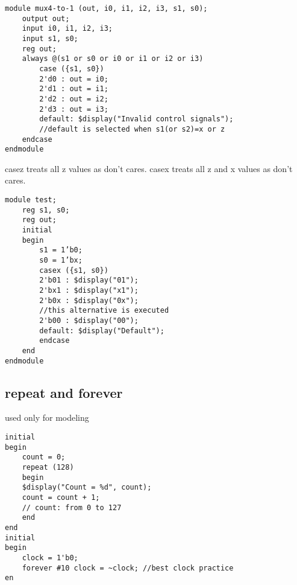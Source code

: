 \begin{lstlisting}
module mux4-to-1 (out, i0, i1, i2, i3, s1, s0);
    output out;
    input i0, i1, i2, i3;
    input s1, s0;
    reg out;
    always @(s1 or s0 or i0 or i1 or i2 or i3)
        case ({s1, s0}) 
        2'd0 : out = i0;
        2'd1 : out = i1;
        2'd2 : out = i2;
        2'd3 : out = i3;
        default: $display("Invalid control signals");
        //default is selected when s1(or s2)=x or z 
    endcase
endmodule
\end{lstlisting}

casez treats all z values as don't cares. casex treats all z and x values as don't cares.

\begin{lstlisting}
module test;
    reg s1, s0;
    reg out;
    initial
    begin
        s1 = 1’b0;
        s0 = 1’bx;
        casex ({s1, s0}) 
        2'b01 : $display("01"); 
        2'bx1 : $display("x1");
        2'b0x : $display("0x"); 
        //this alternative is executed
        2'b00 : $display("00");
        default: $display("Default");
        endcase
    end 
endmodule
\end{lstlisting}

\subsection{repeat and forever}
used only for modeling

\begin{lstlisting}
initial
begin
    count = 0;
    repeat (128)
    begin
    $display("Count = %d", count);
    count = count + 1;
    // count: from 0 to 127
    end
end
initial
begin
    clock = 1'b0;
    forever #10 clock = ~clock; //best clock practice
en
\end{lstlisting}

